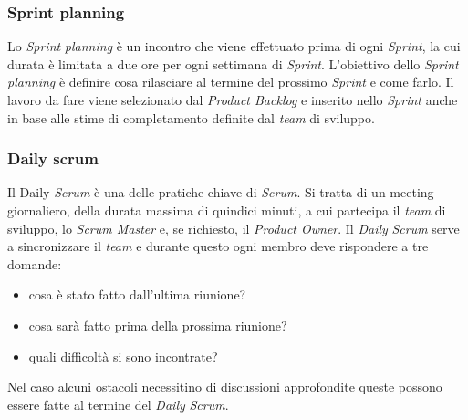 \subsubsection{Sprint planning}
Lo \textit{Sprint} \textit{planning} è un incontro che viene effettuato prima di ogni \textit{Sprint}, la cui durata è limitata a due ore per ogni settimana di \textit{Sprint}. L'obiettivo dello \textit{Sprint} \textit{planning} è definire cosa rilasciare al termine del prossimo \textit{Sprint} e come farlo.
Il lavoro da fare viene selezionato dal \textit{Product Backlog} e inserito nello \textit{Sprint} anche in base alle stime di completamento definite dal \textit{team} di sviluppo.

\subsubsection{Daily scrum}
Il Daily \textit{Scrum} è una delle pratiche chiave di \textit{Scrum}. Si tratta di un meeting giornaliero, della durata massima di quindici minuti, a cui partecipa il \textit{team} di sviluppo, lo \textit{Scrum Master} e, se richiesto, il \textit{Product Owner}. Il \textit{Daily} \textit{Scrum} serve a sincronizzare il \textit{team} e durante questo ogni membro deve rispondere a tre domande:
\begin{itemize}
    \item cosa è stato fatto dall'ultima riunione?
    \item cosa sarà fatto prima della prossima riunione?
    \item quali difficoltà si sono incontrate?
\end{itemize}
Nel caso alcuni ostacoli necessitino di discussioni approfondite queste possono essere fatte al termine del \textit{Daily} \textit{Scrum}.

